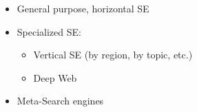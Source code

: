\begin{breakbox}
\begin{itemize}
	\item General purpose, horizontal SE
	\item Specialized SE:
		\begin{itemize}
			\item Vertical SE (by region, by topic, etc.)
			\item Deep Web
		\end{itemize}
	\item Meta-Search engines
\end{itemize}
\end{breakbox}


